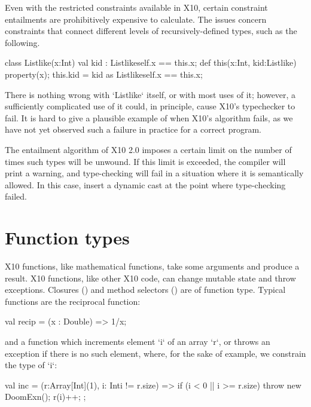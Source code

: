 Even with the restricted constraints available in X10, certain
constraint entailments are prohibitively expensive to calculate.  The issues
concern constraints that connect different levels of recursively-defined
types, such as the following.  
\begin{xten}
class Listlike(x:Int) {
  val kid : Listlike{self.x == this.x};
  def this(x:Int, kid:Listlike) { 
     property(x); 
     this.kid = kid as Listlike{self.x == this.x};}
}
\end{xten}
%
There is nothing wrong with \xcd`Listlike` itself, or with most uses of it;
however, a sufficiently complicated use of it could, in principle, cause X10's
typechecker to fail. 
It is hard to give a plausible example of when X10's algorithm fails, as we
have not yet observed such a failure in practice for a correct program.  

The entailment algorithm of X10 2.0 imposes a certain limit on the number of
times such types will be unwound.   If this limit is exceeded, the compiler
will print a warning, and type-checking will fail in a situation where it is
semantically allowed.  In this case, insert a dynamic cast at the point where
type-checking failed.  





\section{Function types}
\label{FunctionTypes}
\label{FunctionType}

X10 functions, like mathematical functions, take some arguments and produce a
result.  X10 functions, like other X10 code, can change mutable state and
throw exceptions.  Closures () and method
selectors () are of function type.
Typical functions are the reciprocal function: 
\begin{xten}
val recip = (x : Double) => 1/x;
\end{xten}
and a function which increments  element \xcd`i` of an array \xcd`r`, or throws an exception
if there is no such element, where, for the sake of example, we constrain the
type of \xcd`i`:  
\begin{xten}
val inc = (r:Array[Int](1), i: Int{i != r.size}) => {
  if (i < 0 || i >= r.size) throw new DoomExn();
  r(i)++;
};
\end{xten}

